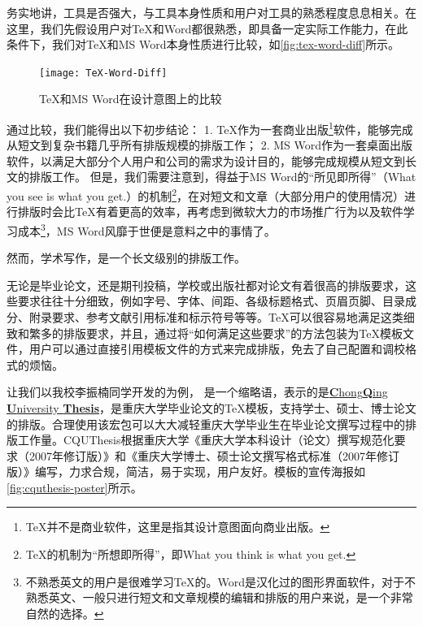 务实地讲，工具是否强大，与工具本身性质和用户对工具的熟悉程度息息相关。在这里，我们先假设用户对\TeX 和Word都很熟悉，即具备一定实际工作能力，在此条件下，我们对\TeX 和MS Word本身性质进行比较，如\autoref{fig:tex-word-diff}所示。

\begin{figure}[tbh]
\centering
\texttt{[image: TeX-Word-Diff]}
\caption{\TeX 和MS Word在设计意图上的比较}
\label{fig:tex-word-diff}
\end{figure}

通过比较，我们能得出以下初步结论：
1. \TeX 作为一套商业出版\footnote{\TeX 并不是商业软件，这里是指其设计意图面向商业出版。}软件，能够完成从短文到复杂书籍几乎所有排版规模的排版工作；
2. MS Word作为一套桌面出版软件，以满足大部分个人用户和公司的需求为设计目的，能够完成规模从短文到长文的排版工作。
但是，我们需要注意到，得益于MS Word的“所见即所得”（What you see is what you get.）的机制\footnote{\TeX 的机制为“所想即所得”，即What you think is what you get.}，在对短文和文章（大部分用户的使用情况）进行排版时会比\TeX 有着更高的效率，再考虑到微软大力的市场推广行为以及软件学习成本\footnote{不熟悉英文的用户是很难学习\TeX 的。Word是汉化过的图形界面软件，对于不熟悉英文、一般只进行短文和文章规模的编辑和排版的用户来说，是一个非常自然的选择。}，MS Word风靡于世便是意料之中的事情了。

然而，学术写作，是一个长文级别的排版工作。

无论是毕业论文，还是期刊投稿，学校或出版社都对论文有着很高的排版要求，这些要求往往十分细致，例如字号、字体、间距、各级标题格式、页眉页脚、目录成分、附录要求、参考文献引用标准和标示符号等等。\TeX 可以很容易地满足这类细致和繁多的排版要求，并且，通过将“如何满足这些要求”的方法包装为\TeX 模板文件，用户可以通过直接引用模板文件的方式来完成排版，免去了自己配置和调校格式的烦恼。

让我们以我校李振楠同学开发的\cquthesis 为例，\href{https://github.com/nanmu42/CQUThesis}{\cquthesis} 是一个缩略语，表示的是\href{https://github.com/nanmu42/CQUThesis}{\textbf{C}hong\textbf{Q}ing \textbf{U}niversity \textbf{Thesis}}，是重庆大学毕业论文的\TeX 模板，支持学士、硕士、博士论文的排版。合理使用该宏包可以大大减轻重庆大学毕业生在毕业论文撰写过程中的排版工作量。CQUThesis根据重庆大学《重庆大学本科设计（论文）撰写规范化要求（2007年修订版）》和《重庆大学博士、硕士论文撰写格式标准（2007年修订版）》编写，力求合规，简洁，易于实现，用户友好。模板的宣传海报如\autoref{fig:cquthesis-poster}所示。

